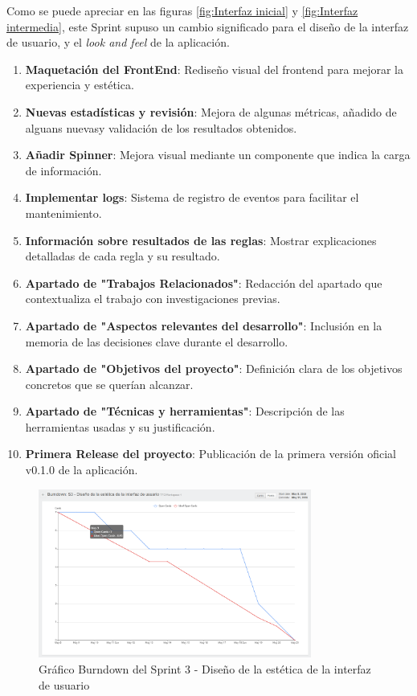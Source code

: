 Como se puede apreciar en las figuras \ref{fig:Interfaz inicial} y \ref{fig:Interfaz intermedia}, este Sprint supuso un cambio significado para el diseño de la interfaz de usuario, y el \textit{look and feel} de la aplicación.

\begin{enumerate}
\item \textbf{Maquetación del FrontEnd}: Rediseño visual del frontend para mejorar la experiencia y estética.
\item \textbf{Nuevas estadísticas y revisión}: Mejora de algunas métricas, añadido de alguans nuevasy validación de los resultados obtenidos.
\item \textbf{Añadir Spinner}: Mejora visual mediante un componente que indica la carga de información.
\item \textbf{Implementar logs}: Sistema de registro de eventos para facilitar el mantenimiento.
\item \textbf{Información sobre resultados de las reglas}: Mostrar explicaciones detalladas de cada regla y su resultado.
\item \textbf{Apartado de "Trabajos Relacionados"}: Redacción del apartado que contextualiza el trabajo con investigaciones previas.
\item \textbf{Apartado de "Aspectos relevantes del desarrollo"}: Inclusión en la memoria de las decisiones clave durante el desarrollo.
\item \textbf{Apartado de "Objetivos del proyecto"}: Definición clara de los objetivos concretos que se querían alcanzar.
\item \textbf{Apartado de "Técnicas y herramientas"}: Descripción de las herramientas usadas y su justificación.
\item \textbf{Primera Release del proyecto}: Publicación de la primera versión oficial v0.1.0 de la aplicación.
\end{enumerate}

\begin{figure}[H]
\centering
\includegraphics[width=0.8\textwidth]{img/BurndownS3.png}
\caption{Gráfico Burndown del Sprint 3 - Diseño de la estética de la interfaz de usuario}
\label{fig:BurndownS3}
\end{figure}


